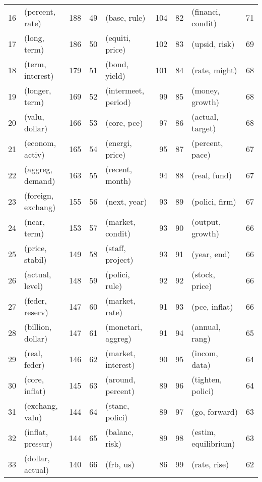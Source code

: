 \begin{tabular}{rlrrlrrlr}
 16 &     (percent, rate) &    188 &  49 &           (base, rule) &    104 &  82 &     (financi, condit) &     71 \\
 17 &        (long, term) &    186 &  50 &        (equiti, price) &    102 &  83 &         (upsid, risk) &     69 \\
 18 &    (term, interest) &    179 &  51 &          (bond, yield) &    101 &  84 &         (rate, might) &     68 \\
 19 &      (longer, term) &    169 &  52 &    (intermeet, period) &     99 &  85 &       (money, growth) &     68 \\
 20 &      (valu, dollar) &    166 &  53 &            (core, pce) &     97 &  86 &      (actual, target) &     68 \\
 21 &     (econom, activ) &    165 &  54 &        (energi, price) &     95 &  87 &       (percent, pace) &     67 \\
 22 &    (aggreg, demand) &    163 &  55 &        (recent, month) &     94 &  88 &          (real, fund) &     67 \\
 23 &  (foreign, exchang) &    155 &  56 &           (next, year) &     93 &  89 &        (polici, firm) &     67 \\
 24 &        (near, term) &    153 &  57 &       (market, condit) &     93 &  90 &      (output, growth) &     66 \\
 25 &     (price, stabil) &    149 &  58 &       (staff, project) &     93 &  91 &           (year, end) &     66 \\
 26 &     (actual, level) &    148 &  59 &         (polici, rule) &     92 &  92 &        (stock, price) &     66 \\
 27 &     (feder, reserv) &    147 &  60 &         (market, rate) &     91 &  93 &         (pce, inflat) &     66 \\
 28 &   (billion, dollar) &    147 &  61 &     (monetari, aggreg) &     91 &  94 &        (annual, rang) &     65 \\
 29 &       (real, feder) &    146 &  62 &     (market, interest) &     90 &  95 &         (incom, data) &     64 \\
 30 &      (core, inflat) &    145 &  63 &      (around, percent) &     89 &  96 &     (tighten, polici) &     64 \\
 31 &     (exchang, valu) &    144 &  64 &        (stanc, polici) &     89 &  97 &         (go, forward) &     63 \\
 32 &   (inflat, pressur) &    144 &  65 &         (balanc, risk) &     89 &  98 &  (estim, equilibrium) &     63 \\
 33 &    (dollar, actual) &    140 &  66 &              (frb, us) &     86 &  99 &          (rate, rise) &     62 \\
\bottomrule
\end{tabular}

